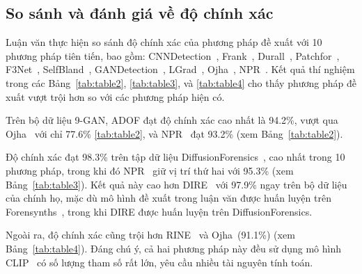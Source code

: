 \subsection{So sánh và đánh giá về độ chính xác}
%
Luận văn thực hiện so sánh độ chính xác của phương pháp đề xuất với 10 phương pháp tiên tiến, bao gồm: 
CNNDetection~\cite{Wang2019CNNGeneratedIA}, 
Frank~\cite{Frank2020LeveragingFA}, 
Durall~\cite{Durall2020WatchYU}, 
Patchfor~\cite{Chai2020WhatMF}, 
F3Net~\cite{Qian2020ThinkingIF}, 
SelfBland~\cite{Shiohara2022DetectingDW}, 
GANDetection~\cite{Mandelli2022DetectingGI}, 
LGrad~\cite{Tan2023LearningOG}, 
Ojha~\cite{Ojha2023TowardsUF}, 
NPR~\cite{Tan2023RethinkingTU}. 
Kết quả thí nghiệm trong các Bảng~\ref{tab:table2}, \ref{tab:table3}, và \ref{tab:table4} cho thấy phương pháp đề xuất vượt trội hơn so với các phương pháp hiện có. 

Trên bộ dữ liệu 9-GAN, ADOF đạt độ chính xác cao nhất là 94.2\%, vượt qua Ojha~\cite{Ojha2023TowardsUF} với chỉ 77.6\% \ref{tab:table2}, và NPR~\cite{Tan2023RethinkingTU} đạt 93.2\% (xem Bảng~\ref{tab:table2}).

Độ chính xác đạt 98.3\% trên tập dữ liệu DiffusionForensics~\cite{Wang2023DIREFD}, cao nhất trong 10 phương pháp, trong khi đó NPR~\cite{Tan2023RethinkingTU} giữ vị trí thứ hai với 95.3\% (xem Bảng~\ref{tab:table3}). Kết quả này cao hơn DIRE~\cite{Wang2023DIREFD} với 97.9\% ngay trên bộ dữ liệu của chính họ, mặc dù mô hình đề xuất trong luận văn được huấn luyện trên Forensynths~\cite{Krizhevsky2012ImageNetCW}, trong khi DIRE được huấn luyện trên DiffusionForensics.

Ngoài ra, độ chính xác cũng trội hơn RINE~\cite{koutlis2024leveraging} và Ojha~\cite{Ojha2023TowardsUF}(91.1\%) (xem Bảng~\ref{tab:table4}). Đáng chú ý, cả hai phương pháp này đều sử dụng mô hình CLIP~\cite{abs-2103-00020} có số lượng tham số rất lớn, yêu cầu nhiều tài nguyên tính toán.






